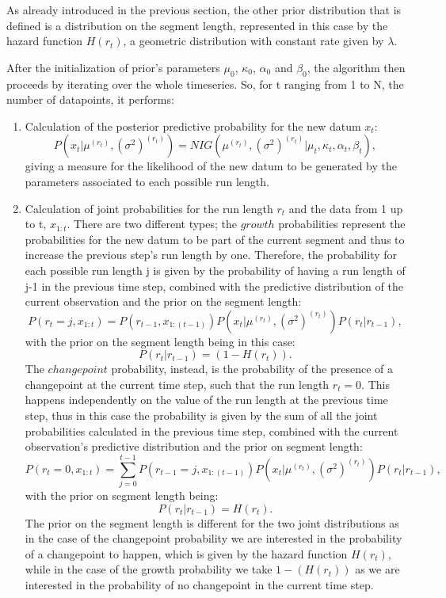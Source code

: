 \documentclass[a4paper]{article}
\begin{document}
As already introduced in the previous section, the other prior distribution that is defined is a distribution on the segment length, represented in this case by the hazard function $H(r_t)$, a geometric distribution with constant rate given by $\lambda$.

After the initialization of prior's parameters $\mu_0$, $\kappa_0$, $\alpha_0$ and $\beta_0$, the algorithm then proceeds by iterating over the whole timeseries. So, for t ranging from 1 to N, the number of datapoints, it performs:
 
\begin{enumerate}

\item Calculation of the posterior predictive probability for the new datum $x_t$:
\[P(x_t | \mu^{(r_t)}, (\sigma^2)^{(r_t)}) = NIG(\mu^{(r_t)}, (\sigma^2)^{(r_t)} | \mu_t, \kappa_t, \alpha_t, \beta_t),\]
giving a measure for the likelihood of the new datum to be generated by the parameters associated to each possible run length.

\item Calculation of joint probabilities for the run length $r_t$ and the data from 1 up to t, $x_{1:t}$. There are two different types; the $growth$ probabilities represent the probabilities for the new datum to be part of the current segment and thus to increase the previous step's run length by one. Therefore, the probability for each possible run length j is given by the probability of having a run length of j-1 in the previous time step, combined with the predictive distribution of the current observation and the prior on the segment length:
\[P(r_t = j , x_{1:t}) = P(r_{t-1} , x_{1:(t-1)})  P(x_t | \mu^{(r_t)}, (\sigma^2)^{(r_t)})  P(r_t | r_{t - 1}),\]
with the prior on the segment length being in this case:
\[P(r_t | r_{t - 1}) = (1-H(r_t)).\]
The $changepoint$ probability, instead, is the probability of the presence of a changepoint at the current time step, such that the run length $r_t = 0$. This happens independently on the value of the run length at the previous time step, thus in this case the probability is given by the sum of all the joint probabilities calculated in the previous time step, combined with the current observation's predictive distribution and the prior on segment length:
\[P(r_t = 0 , x_{1:t}) = \sum_{j=0}^{t-1} P(r_{t-1} = j , x_{1:(t-1)})  P(x_t | \mu^{(r_t)}, (\sigma^2)^{(r_t)})  P(r_t | r_{t - 1}),\]
with the prior on segment length being:
\[P(r_t | r_{t - 1}) = H(r_t).\]
The prior on the segment length is different for the two joint distributions as in the case of the changepoint probability we are interested in the probability of a changepoint to happen, which is given by the hazard function $H(r_t)$, while in the case of the growth probability we take $1 - (H(r_t))$ as we are interested in the probability of no changepoint in the current time step.


\end{enumerate}
\end{document}
